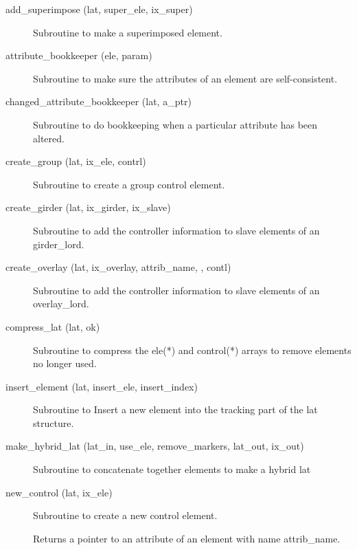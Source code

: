 \begin{description}

\item[add_superimpose (lat, super_ele, ix_super)] \Newline
Subroutine to make a superimposed element. 

\item[attribute_bookkeeper (ele, param)] \Newline
Subroutine to make sure the attributes of an element are self-consistent. 

\item[changed_attribute_bookkeeper (lat, a_ptr)] \Newline 
Subroutine to do bookkeeping when a particular attribute has been altered.

\item[create_group (lat, ix_ele, contrl)] \Newline
Subroutine to create a group control element. 

\item[create_girder (lat, ix_girder, ix_slave)] \Newline 
     Subroutine to add the controller information to slave elements of
     an girder_lord.

\item[create_overlay (lat, ix_overlay, attrib_name, , contl)] \Newline
Subroutine to add the controller information to slave elements of an 
overlay_lord. 

\item[compress_lat (lat, ok)] \Newline
Subroutine to compress the ele(*) and control(*) arrays to remove
elements no longer used.

\item[insert_element (lat, insert_ele, insert_index)] \Newline
Subroutine to Insert a new element into the tracking part of the 
lat structure. 

\item[make_hybrid_lat (lat_in, use_ele, remove_markers, lat_out, ix_out)] \Newline
Subroutine to concatenate together elements to make a hybrid lat 

\item[new_control (lat, ix_ele)] \Newline
Subroutine to create a new control element. 

\item[\protect\parbox{6in}{pointer_to_attribute (ele, attrib_name, do_allocation, 
\\ \hspace*{2in} ptr_attrib, ix_attrib, err_flag, err_print_flag)}] \Newline
Returns a pointer to an attribute of an element with name attrib_name. 


\end{description}
